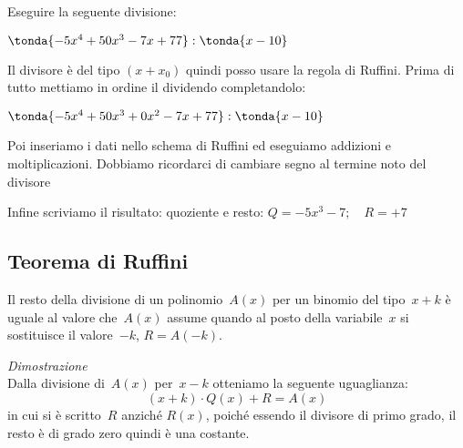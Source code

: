%
 \begin{esempio}
Eseguire la seguente divisione:

\(\tonda{-5x^4 +50x^3 -7x +77  } : \tonda{x -10}\)

Il divisore è del tipo \((x + x_0)\) quindi posso usare la regola di Ruffini.
Prima di tutto mettiamo in ordine il dividendo completandolo:

\(\tonda{-5x^4 +50x^3 +0x^2 -7x +77  } : \tonda{x -10}\)

Poi inseriamo i dati nello schema di Ruffini ed eseguiamo addizioni e 
moltiplicazioni. Dobbiamo ricordarci di cambiare segno al termine noto del 
divisore

\begin{inaccessibleblock}
\begin{center}
% 
\ruffinie
\end{center}
\end{inaccessibleblock}

Infine scriviamo il risultato: quoziente e resto:
\(Q = -5 x^3 -7 ; \quad R = +7\)
\end{esempio}

\subsection{Teorema di Ruffini}
\label{subsec:divpol_teorema_ruffini}

\begin{teorema}
 Il resto della divisione di un polinomio~\(A(x)\) per un
binomio del tipo~\(x+k\) è uguale al valore che~\(A(x)\) assume quando
al posto della variabile~\(x\) si sostituisce il valore~\(-k\), \(R=A(-k)\).
\end{teorema}

\emph{Dimostrazione}\\
Dalla divisione di~\(A(x)\) per~\(x-k\) otteniamo la seguente
uguaglianza:
\[(x+k)\cdot Q(x)+R=A(x)\]
in cui si è scritto~\(R\) anziché \(R(x)\), poiché essendo il divisore di 
primo grado, il resto è di grado zero quindi è una costante.

